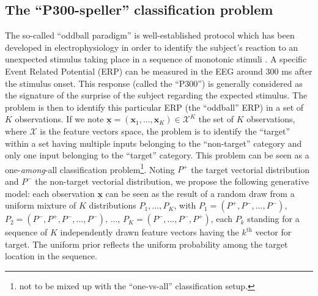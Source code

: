 \documentclass[conference]{IEEEtran}
\begin{document}
\subsection{The ``P300-speller'' classification problem}

The so-called ``oddball paradigm'' is well-established protocol which has been developed in electrophysiology 
in order to identify the subject's reaction to an unexpected stimulus taking place 
in a sequence of monotonic stimuli \cite{Farwell88}.
A specific Event Related Potential (ERP) can be measured in the EEG around 300 ms after the stimulus onset.
This response (called the ``P300'') is generally considered as the signature of the surprise of the subject regarding 
the expected stimulus. 
The problem is then to identify this particular
ERP (the ``oddball'' ERP) in a set of $K$ observations. 
If we note $\underline{\mathbf{x}} = (\boldsymbol{x}_1,...,\boldsymbol{x}_K) \in \mathcal{X}^K$ the set of $K$ observations,
where $\mathcal{X}$ is the feature vectors space, 
the problem is to identify the ``target'' 
within a set having multiple inputs belonging to the ``non-target'' category
and only one input belonging to the ``target'' category. 
This problem can be seen as a one-\emph{among}-all classification problem\footnote{not to be mixed up with the ``one-vs-all'' classification setup.}.
Noting $P^+$ the target vectorial distribution and
$P^-$ the non-target vectorial distribution, we propose the following generative model: 
each observation $\underline{\mathbf{x}}$ can be seen as the result of a random draw from a uniform 
mixture of $K$ distributions $P_1, ..., P_K$,  
with $P_1 = (P^+,P^-,...,P^-)$, $P_2=(P^-,P^+,P^-,...,P^-)$, ..., $P_K=(P^-,...,P^-,P^+)$,
each $P_k$ standing for a sequence of $K$ independently drawn feature vectors having the $k^\text{th}$ vector for target.
The uniform prior reflects the uniform probability among the target location in the sequence.
\end{document}

